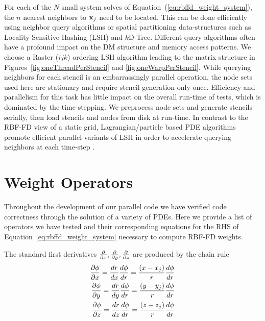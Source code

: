 \documentclass{report}
\begin{document}
{For each of the $N$ small system solves of Equation~(\ref{eq:rbffd_weight_system}), the $n$ nearest neighbors to $\mathbf{x}_j$ need to be located. This can be done efficiently using neighbor query algorithms or spatial partitioning data-structures such as Locality Sensitive Hashing (LSH) and $k$D-Tree. Different query algorithms often have a profound impact on the DM structure and memory access patterns. We choose a Raster ($ijk$) ordering LSH algorithm \cite{Bollig2011} leading to the matrix structure in Figures~\ref{fig:oneThreadPerStencil} and \ref{fig:oneWarpPerStencil}. While querying neighbors for each stencil is an embarrassingly parallel operation, the node sets used here are stationary and require stencil generation only once. Efficiency and parallelism for this task has little impact on the overall run-time of tests, which is dominated by the time-stepping. We preprocess node sets and generate stencils serially, then load stencils and nodes from disk at run-time. In contrast to the RBF-FD view of a static grid, Lagrangian/particle based PDE algorithms promote efficient parallel variants of LSH in order to accelerate querying neighbors at each time-step \cite{Pan2011, Goswami2010}. 


\section{Weight Operators}
Throughout the development of our parallel code we have verified code correctness through the solution of a variety of PDEs. Here we provide a list of operators we have tested and their corresponding equations for the RHS of Equation~\ref{eq:rbffd_weight_system} necessary to compute RBF-FD weights. 

The standard first derivatives $\frac{\partial }{\partial x}, \frac{\partial }{\partial y}, \frac{\partial }{\partial z}$ are produced by the chain rule
	\begin{align} 
	 \frac{\partial \phi}{\partial x} = \frac{d r}{d x} \frac{d \phi}{d r} = \frac{(x-x_{j})}{r} \frac{d \phi}{d r} \\
	 \frac{\partial \phi}{\partial y} = \frac{d r}{d y} \frac{d \phi}{d r} = \frac{(y-y_{j})}{r} \frac{d \phi}{d r} \\
	 \frac{\partial \phi}{\partial z} = \frac{d r}{d z} \frac{d \phi}{d r} = \frac{(z-z_{j})}{r} \frac{d \phi}{d r}
	\end{align}

}
\end{document}
